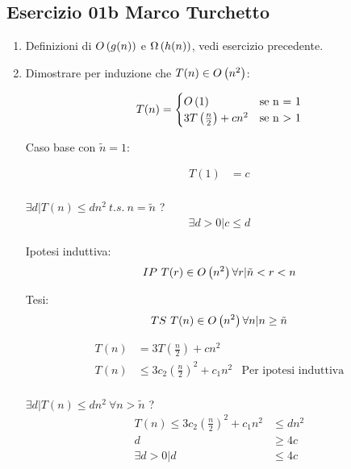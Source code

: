 
\subsection[01b MT]{Esercizio 01b Marco Turchetto}

\begin{enumerate}[label=\alph*)]
\item
	Definizioni di \( O\left(g(n)\right) \) e \( \Omega\left(h(n)\right) \), vedi esercizio precedente.

\item 
	Dimostrare per induzione che \( T(n) \in O\left(n^2\right) \):

	\begin{equation*}
		T(n)=
		\begin{cases}
			O\left(1\right)								& \text{se n = 1} \\
			3T \left(\frac{n}{2} \right) + c n^2	& \text{se n > 1} \\
		\end{cases}
	\end{equation*}
	
	Caso base con \( \tilde{n} = 1 \):
	
	\begin{align*}
		T(1) &= c \\
	\end{align*}
	
	\( \exists d | T(n) \leq d n^2 \ t.s. \ n = \tilde{n} \) ? \\
	
	\begin{align*}
		\exists d > 0 | c \leq d
	\end{align*}
	
	Ipotesi induttiva:\\
	\[
		IP \ T(r) \in O\left(n ^ 2\right) \forall r | \tilde{n} < r < n
	\]
	
	Tesi:\\
	\[
		TS \ T(n) \in O\left(n ^ 2\right) \forall n | n \geq \tilde{n}
	\]
	
	\begin{align*}
		T(n) &= 3T \left(\frac{n}{2} \right) + c n^2   \\
		T(n) &\leq 3c_2 \left( \frac{n}{2} \right)^2 + c_1 n^2 & \text{Per ipotesi induttiva} \\
	\end{align*}
	
	\( \exists d | T(n) \leq d n^2 \ \forall n > \tilde{n} \) ? \\
	
	\begin{align*}
		T(n) \leq 3c_2 \left( \frac{n}{2} \right)^2 + c_1 n^2 &\leq d n^2 \\
		d &\geq 4c \\
		\exists d > 0 | d &\leq 4c \\
	\end{align*}

\end{enumerate}
